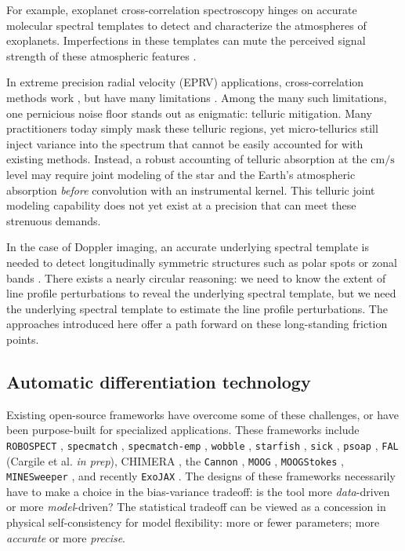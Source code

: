 \documentclass[twocolumn]{aastex631}
\begin{document}
For example, exoplanet cross-correlation spectroscopy \citep{2013MNRAS.436L..35B} hinges on accurate molecular spectral templates to detect and characterize the atmospheres of exoplanets.  Imperfections in these templates can mute the perceived signal strength of these atmospheric features \citep{2015A&A...575A..20H}.

In extreme precision radial velocity (EPRV) applications, cross-correlation methods work \citep{2018A_A...620A..47D}, but have many limitations \citep{2022arXiv220110639Z}.  Among the many such limitations, one pernicious noise floor stands out as enigmatic: telluric mitigation.  Many practitioners today simply mask these telluric regions, yet micro-tellurics still inject variance into the spectrum that cannot be easily accounted for with existing methods.  Instead, a robust accounting of telluric absorption at the $\mathrm{cm/s}$ level may require joint modeling of the star and the Earth's atmospheric absorption \emph{before} convolution with an instrumental kernel.  This telluric joint modeling capability does not yet exist at a precision that can meet these strenuous demands.

In the case of Doppler imaging, an accurate underlying spectral template is needed to detect longitudinally symmetric structures \citep{1983PASP...95..565V,2021arXiv211006271L} such as polar spots \citep{roettenbacher16} or zonal bands \citep{Crossfield14,2021ApJ...906...64A}.  There exists a nearly circular reasoning: we need to know the extent of line profile perturbations to reveal the underlying spectral template, but we need the underlying spectral template to estimate the line profile perturbations.  The approaches introduced here offer a path forward on these long-standing friction points.

\subsection{Automatic differentiation technology}

Existing open-source frameworks have overcome some of these challenges, or have been purpose-built for specialized applications.
These frameworks include \texttt{ROBOSPECT} \citep{2013PASP..125.1164W}, \texttt{specmatch} \citep{2015PhDT........82P}, \texttt{specmatch-emp} \citep{2017ApJ...836...77Y}, \texttt{wobble} \citep{2019AJ....158..164B}, \texttt{starfish} \citep{czekala15}, \texttt{sick} \citep{2016ApJS..223....8C}, \texttt{psoap} \citep{2017ApJ...840...49C}, \texttt{FAL} (Cargile et al. \emph{in prep}), CHIMERA \citep{2015ApJ...807..183L}, the \texttt{Cannon} \citep{2017ApJ...836....5H},  \texttt{MOOG} \citep{2012ascl.soft02009S}, \texttt{MOOGStokes} \citep{2013AJ....146...51D}, \texttt{MINESweeper} \citep{2020ApJ...900...28C}, and recently \texttt{ExoJAX} \citep{2022ApJS..258...31K}.
The designs of these frameworks necessarily have to make a choice in the bias-variance tradeoff: is the tool more \emph{data}-driven or more \emph{model}-driven?  The statistical tradeoff can be viewed as a concession in physical self-consistency for model flexibility: more or fewer parameters; more \emph{accurate} or more \emph{precise}.
\end{document}

